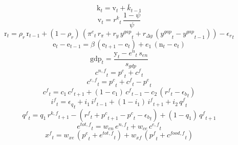 \begin{dmath}
{{\mathrm{k}}}_{t}={{\mathrm{v}}}_{t}+{{\bar{k}}}_{t-1}
\end{dmath}
\begin{dmath}
{{\mathrm{v}}}_{t}={{r^{k}}}_{t}\, \frac{1-{{\psi}}}{{{\psi}}}
\end{dmath}
\begin{dmath}
{{\mathrm{r}}}_{t}={{\rho_{r}}}\, {{\mathrm{r}}}_{t-1}+\left(1-{{\rho_{r}}}\right)\, \left({{\pi^{c}}}_{t}\, {{r_{\pi}}}+{{r_{y}}}\, {{y^{gap}}}_{t}+{{r_{\Delta y}}}\, \left({{y^{gap}}}_{t}-{{y^{gap}}}_{t-1}\right)\right)-{{\epsilon_{r}}}_{t}
\end{dmath}
\begin{dmath}
{{\mathrm{e}}}_{t}-{{\mathrm{e}}}_{t-1}={{\beta}}\, \left({{\mathrm{e}}}_{t+1}-{{\mathrm{e}}}_{t}\right)+{{e_{1}}}\, \left({{\mathrm{n}}}_{t}-{{\mathrm{e}}}_{t}\right)
\end{dmath}
\begin{dmath}
{{\mathrm{gdp}}}_{t}=\frac{{{\mathrm{y}}}_{t}-{{e^{n}}}_{t}\, {{s_{en}}}}{{{s_{gdp}}}}
\end{dmath}
\begin{dmath}
{{c^{n,f}}}_{t}={{p^{c}}}_{t}+{{c^{f}}}_{t}
\end{dmath}
\begin{dmath}
{{c^{e,f}}}_{t}={{p^{c}}}_{t}+{{c^{f}}}_{t}-{{p^{e}}}_{t}
\end{dmath}
\begin{dmath}
{{c^{f}}}_{t}={{c_{1}}}\, {{c^{f}}}_{t+1}+\left(1-{{c_{1}}}\right)\, {{c^{f}}}_{t-1}-{{c_{2}}}\, \left({{r^{f}}}_{t}-{{\epsilon_{b}}}_{t}\right)
\end{dmath}
\begin{dmath}
{{i^{f}}}_{t}={{\epsilon_{q}}}_{t}+{{i_{1}}}\, {{i^{f}}}_{t-1}+\left(1-{{i_{1}}}\right)\, {{i^{f}}}_{t+1}+{{i_{2}}}\, {{q^{f}}}_{t}
\end{dmath}
\begin{dmath}
{{q^{f}}}_{t}={{q_{1}}}\, {{r^{k,f}}}_{t+1}-\left({{r^{f}}}_{t}+{{p^{c}}}_{t+1}-{{p^{c}}}_{t}-{{\epsilon_{b}}}_{t}\right)+\left(1-{{q_{1}}}\right)\, {{q^{f}}}_{t+1}
\end{dmath}
\begin{dmath}
{{e^{tot,f}}}_{t}={{w_{en}}}\, {{e^{n,f}}}_{t}+{{w_{ce}}}\, {{c^{e,f}}}_{t}
\end{dmath}
\begin{dmath}
{{x^{f}}}_{t}={{w_{xe}}}\, \left({{p^{e}}}_{t}+{{e^{tot,f}}}_{t}\right)+{{w_{xf}}}\, \left({{p^{f}}}_{t}+{{c^{food,f}}}_{t}\right)
\end{dmath}
